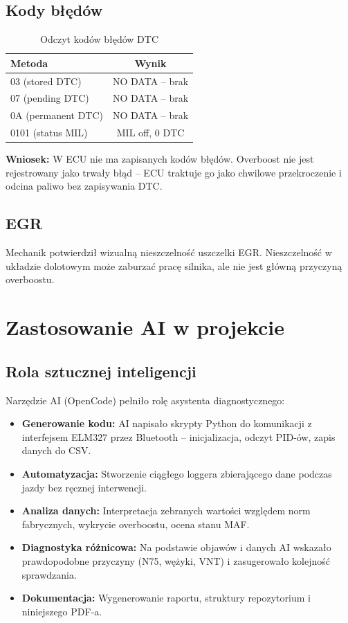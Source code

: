 \documentclass[12pt,a4paper]{article}
\begin{document}
\subsection{Kody błędów}

\begin{table}[h]
\centering
\begin{tabular}{lc}
\toprule
\textbf{Metoda} & \textbf{Wynik} \\
\midrule
03 (stored DTC) & NO DATA – brak \\
07 (pending DTC) & NO DATA – brak \\
0A (permanent DTC) & NO DATA – brak \\
0101 (status MIL) & MIL off, 0 DTC \\
\bottomrule
\end{tabular}
\caption{Odczyt kodów błędów DTC}
\end{table}

\textbf{Wniosek:} W ECU nie ma zapisanych kodów błędów. Overboost nie jest
rejestrowany jako trwały błąd – ECU traktuje go jako chwilowe przekroczenie
i odcina paliwo bez zapisywania DTC.

\subsection{EGR}

Mechanik potwierdził wizualną nieszczelność uszczelki EGR. Nieszczelność w
układzie dolotowym może zaburzać pracę silnika, ale nie jest główną przyczyną
overboostu.

\section{Zastosowanie AI w projekcie}

\subsection{Rola sztucznej inteligencji}

Narzędzie AI (OpenCode) pełniło rolę asystenta diagnostycznego:

\begin{itemize}
    \item \textbf{Generowanie kodu:} AI napisało skrypty Python do komunikacji
          z interfejsem ELM327 przez Bluetooth – inicjalizacja, odczyt PID-ów,
          zapis danych do CSV.
    \item \textbf{Automatyzacja:} Stworzenie ciągłego loggera zbierającego dane
          podczas jazdy bez ręcznej interwencji.
    \item \textbf{Analiza danych:} Interpretacja zebranych wartości względem
          norm fabrycznych, wykrycie overboostu, ocena stanu MAF.
    \item \textbf{Diagnostyka różnicowa:} Na podstawie objawów i danych AI
          wskazało prawdopodobne przyczyny (N75, wężyki, VNT) i zasugerowało
          kolejność sprawdzania.
    \item \textbf{Dokumentacja:} Wygenerowanie raportu, struktury repozytorium
          i niniejszego PDF-a.
\end{itemize}
\end{document}
